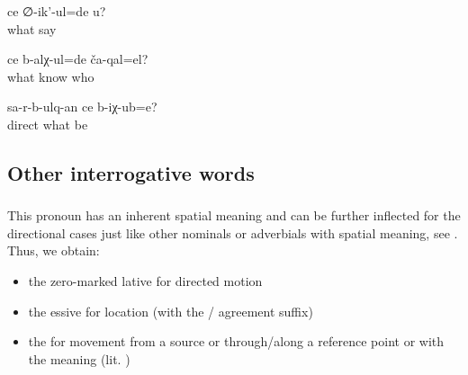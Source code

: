 \begin{exe}
	\ex	\label{ex:What do you (masc.) say}
	\gll	ce	∅-ik'-ul=de	u?\\
		what	say	\\
	\glt	{}

	\ex	\label{ex:How do you know who they are}
	\gll	ce	b-alχ-ul=de	ča-qal=el?\\
		what	know	who\\
	\glt	{}

	\ex	\label{ex:(The picture on which the people) run away, where is it}
	\gll	sa-r-b-ulq-an	ce	b-iχ-ub=e?\\
		direct	what	be\\
	\glt	{}
\end{exe}



\subsection{Other interrogative words}
\label{ssec:Other interrogative pronouns}



\subsubsection{ }
\label{sssec:cina where}

This pronoun has an inherent spatial meaning and can be further inflected for the directional cases just like other nominals or adverbials with spatial meaning, see . Thus, we obtain:

\begin{itemize}
	\item	the zero-marked lative  for directed motion 
	\item	the essive  for location (with the / agreement suffix) 
	\item	the   for movement from a source or through\slash along a reference point or with the meaning  (lit. ) 
\end{itemize}

